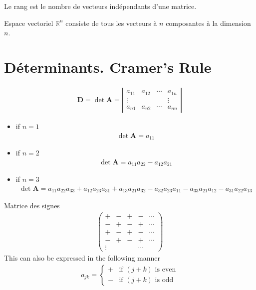 Le rang est le nombre de vecteurs indépendants d'une matrice.

Espace vectoriel $\mathbb R^n$ consiste de tous les vecteurs à $n$ composantes à la dimension $n$.

\section{Déterminants. Cramer's Rule}
\begin{eqnarray}
	\mathbf{D}=\det \mathbf{A}=\left|
	\begin{matrix}
		a_{11} & a_{12} & \cdots & a_{1n}
		\\
		\vdots & & & \vdots
		\\
		a_{n1} & a_{n2} & \cdots & a_{nn}
	\end{matrix}\right|
\end{eqnarray}
\begin{itemize}
	\item if $n=1$
	\begin{eqnarray}
		\det \mathbf{A}=a_{11}
	\end{eqnarray}
	\item if $n=2$
	\begin{eqnarray}
		\det \mathbf{A}=a_{11}a_{22}-a_{12}a_{21}
	\end{eqnarray}
	\item if $n=3$
	\begin{eqnarray}
		\det \mathbf{A}=a_{11}a_{22}a_{33}+a_{12}a_{23}a_{31}+a_{13}a_{21}a_{32}-a_{32}a_{23}a_{11}-a_{33}a_{21}a_{12}-a_{31}a_{22}a_{13}
	\end{eqnarray}
\end{itemize}

\begin{myDefinition}
	Matrice des signes
	\begin{eqnarray}
		\begin{pmatrix}
			+ & - & + & - & \cdots \\
			 - & + & - & + &  \cdots \\
			+ & - & + & - & \cdots \\
			 - & + & - & + & \cdots \\
			\vdots & & & \cdots
		\end{pmatrix}
	\end{eqnarray}
	This can also be expressed in the following manner
	\begin{eqnarray}
		a_{jk}=
		\begin{cases}
			+ & \text{if }(j+k)\text{ is even}
			\\
			- & \text{if }(j+k)\text{ is odd}
		\end{cases}
	\end{eqnarray}
\end{myDefinition}

